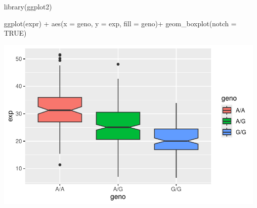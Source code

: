 \documentclass[
  letterpaper,
  DIV=11,
  numbers=noendperiod]{scrartcl}
\newenvironment{Shaded}{\begin{snugshade}}{\end{snugshade}}
\newcommand{\AttributeTok}[1]{\textcolor[rgb]{0.40,0.45,0.13}{#1}}
\newcommand{\ConstantTok}[1]{\textcolor[rgb]{0.56,0.35,0.01}{#1}}
\newcommand{\FunctionTok}[1]{\textcolor[rgb]{0.28,0.35,0.67}{#1}}
\newcommand{\NormalTok}[1]{\textcolor[rgb]{0.00,0.23,0.31}{#1}}
\newcommand{\SpecialCharTok}[1]{\textcolor[rgb]{0.37,0.37,0.37}{#1}}
\begin{document}
\begin{Shaded}
\begin{Highlighting}[]
\FunctionTok{library}\NormalTok{(ggplot2)}
\end{Highlighting}
\end{Shaded}

\begin{Shaded}
\begin{Highlighting}[]
\FunctionTok{ggplot}\NormalTok{(expr) }\SpecialCharTok{+}
  \FunctionTok{aes}\NormalTok{(}\AttributeTok{x =}\NormalTok{ geno, }\AttributeTok{y =}\NormalTok{ exp, }\AttributeTok{fill =}\NormalTok{ geno)}\SpecialCharTok{+}
  \FunctionTok{geom\_boxplot}\NormalTok{(}\AttributeTok{notch =} \ConstantTok{TRUE}\NormalTok{)}
\end{Highlighting}
\end{Shaded}

\includegraphics{./-class11_files/figure-pdf/unnamed-chunk-10-1.pdf}
\end{document}
